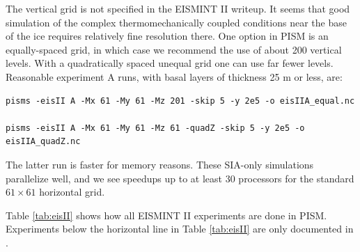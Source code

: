 \documentclass[11pt,final]{amsart}
\begin{document}
The vertical grid is not specified in the EISMINT II writeup.  It seems that good simulation of the complex thermomechanically coupled conditions near the base of the ice requires relatively fine resolution there.  One option in PISM is an equally-spaced grid, in which case we recommend the use of about 200 vertical levels.  With a quadratically spaced unequal grid one can use far fewer levels.  Reasonable experiment A runs, with basal layers of thickness 25 m or less, are:

\begin{verbatim}
pisms -eisII A -Mx 61 -My 61 -Mz 201 -skip 5 -y 2e5 -o eisIIA_equal.nc

pisms -eisII A -Mx 61 -My 61 -Mz 61 -quadZ -skip 5 -y 2e5 -o eisIIA_quadZ.nc
\end{verbatim}
\noindent The latter run is faster for memory reasons.  These SIA-only simulations parallelize well, and we see speedups up to at least 30 processors for the standard $61\times 61$ horizontal grid.

Table \ref{tab:eisII} shows how all EISMINT II experiments are done in PISM.  Experiments below the horizontal line in Table \ref{tab:eisII} are only documented in \cite{EISIIdescribe}.
\end{document}
